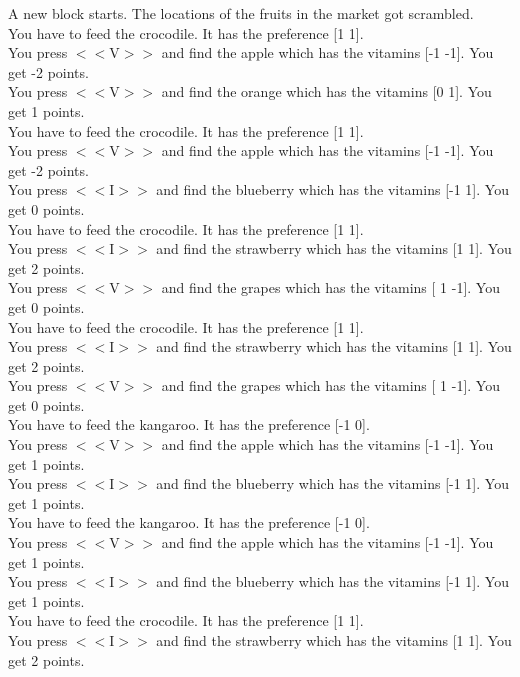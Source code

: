 \documentclass[pdflatex,sn-nature]{sn-jnl}%
\theoremstyle{thmstyleone}%
\theoremstyle{thmstyletwo}%
\theoremstyle{thmstylethree}%
\begin{document}
A new block starts. The locations of the fruits in the market got scrambled. $~$\\ 
You have to feed the crocodile. It has the preference [1 1]. $~$\\ 
You press $<<$V$>>$ and find the apple which has the vitamins [-1 -1]. You get -2 points. $~$\\ 
You press $<<$V$>>$ and find the orange which has the vitamins [0 1]. You get 1 points. $~$\\ 
You have to feed the crocodile. It has the preference [1 1]. $~$\\ 
You press $<<$V$>>$ and find the apple which has the vitamins [-1 -1]. You get -2 points. $~$\\ 
You press $<<$I$>>$ and find the blueberry which has the vitamins [-1  1]. You get 0 points. $~$\\ 
You have to feed the crocodile. It has the preference [1 1]. $~$\\ 
You press $<<$I$>>$ and find the strawberry which has the vitamins [1 1]. You get 2 points. $~$\\ 
You press $<<$V$>>$ and find the grapes which has the vitamins [ 1 -1]. You get 0 points. $~$\\ 
You have to feed the crocodile. It has the preference [1 1]. $~$\\ 
You press $<<$I$>>$ and find the strawberry which has the vitamins [1 1]. You get 2 points. $~$\\ 
You press $<<$V$>>$ and find the grapes which has the vitamins [ 1 -1]. You get 0 points. $~$\\ 
You have to feed the kangaroo. It has the preference [-1  0]. $~$\\ 
You press $<<$V$>>$ and find the apple which has the vitamins [-1 -1]. You get 1 points. $~$\\ 
You press $<<$I$>>$ and find the blueberry which has the vitamins [-1  1]. You get 1 points. $~$\\ 
You have to feed the kangaroo. It has the preference [-1  0]. $~$\\ 
You press $<<$V$>>$ and find the apple which has the vitamins [-1 -1]. You get 1 points. $~$\\ 
You press $<<$I$>>$ and find the blueberry which has the vitamins [-1  1]. You get 1 points. $~$\\ 
You have to feed the crocodile. It has the preference [1 1]. $~$\\ 
You press $<<$I$>>$ and find the strawberry which has the vitamins [1 1]. You get 2 points. $~$\\ 
\end{document}
